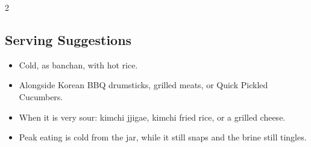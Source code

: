 \documentclass[11pt,letterpaper]{article}
\begin{document}
{\begin{multicols}{2}
\subsection*{Serving Suggestions}
\begin{itemize}
    \item Cold, as banchan, with hot rice.
    \item Alongside Korean BBQ drumsticks, grilled meats, or Quick Pickled Cucumbers.
    \item When it is very sour: kimchi jjigae, kimchi fried rice, or a grilled cheese.
    \item Peak eating is cold from the jar, while it still snaps and the brine still tingles.
\end{itemize}

\end{multicols}
}
\end{document}
